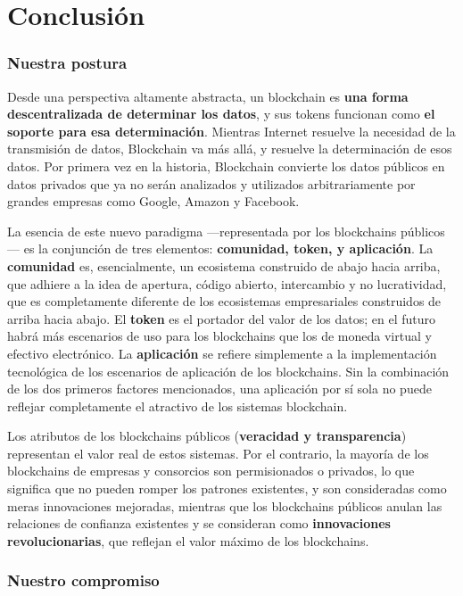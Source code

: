 \section{Conclusión}
\label{sec:conclusion}

\subsubsection*{Nuestra postura}

Desde una perspectiva altamente abstracta, un blockchain es \textbf{una forma descentralizada de determinar los datos}, y sus tokens funcionan como \textbf{el soporte para esa determinación}. Mientras Internet resuelve la necesidad de la transmisión de datos, Blockchain va más allá, y resuelve la determinación de esos datos. Por primera vez en la historia, Blockchain convierte los datos públicos en datos privados que ya no serán analizados y utilizados arbitrariamente por grandes empresas como Google, Amazon y Facebook.

La esencia de este nuevo paradigma —representada por los blockchains públicos— es la conjunción de tres elementos: \textbf{comunidad, token, y aplicación}. La \textbf{comunidad} es, esencialmente, un ecosistema construido de abajo hacia arriba, que adhiere a la idea de apertura, código abierto, intercambio y no lucratividad, que es completamente diferente de los ecosistemas empresariales construidos de arriba hacia abajo. El \textbf{token} es el portador del valor de los datos; en el futuro habrá más escenarios de uso para los blockchains que los de moneda virtual y efectivo electrónico. La \textbf{aplicación} se refiere simplemente a la implementación tecnológica de los escenarios de aplicación de los blockchains. Sin la combinación de los dos primeros factores mencionados, una aplicación por sí sola no puede reflejar completamente el atractivo de los sistemas blockchain.

Los atributos de los blockchains públicos (\textbf{veracidad y transparencia}) representan el valor real de estos sistemas. Por el contrario, la mayoría de los blockchains de empresas y consorcios son permisionados o privados, lo que significa que no pueden romper los patrones existentes, y son consideradas como meras innovaciones mejoradas, mientras que los blockchains públicos anulan las relaciones de confianza existentes y se consideran como \textbf{innovaciones revolucionarias}, que reflejan el valor máximo de los blockchains.

\subsubsection*{Nuestro compromiso}

